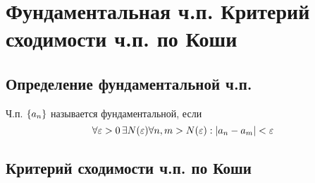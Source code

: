 \chapter{Фундаментальная ч.п. Критерий сходимости ч.п. по Коши}

\section{Определение фундаментальной ч.п.}

{
    Ч.п. $\{ a_n \}$ называется фундаментальной, если
    \[\forall \varepsilon > 0 \, \exists N(\varepsilon) \forall n, m > N(\varepsilon): | a_n - a_m | < \varepsilon \]
}

\section{Критерий сходимости ч.п. по Коши}

